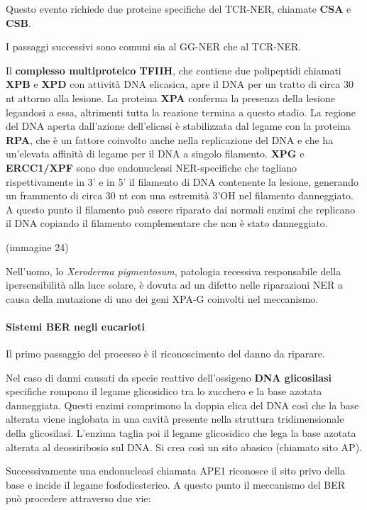 \documentclass[11pt]{book}
\begin{document}
Questo evento richiede due proteine specifiche del TCR-NER, chiamate
\textbf{CSA} e \textbf{CSB}.

I passaggi successivi sono comuni sia al GG-NER che al TCR-NER.

Il \textbf{complesso multiproteico TFIIH}, che contiene due polipeptidi
chiamati \textbf{XPB} e \textbf{XPD} con attività DNA elicasica, apre il
DNA per un tratto di circa 30 nt attorno alla lesione. La proteina
\textbf{XPA} conferma la presenza della lesione legandosi a essa,
altrimenti tutta la reazione termina a questo stadio. La regione del DNA
aperta dall'azione dell'elicasi è stabilizzata dal legame con la
proteina \textbf{RPA}, che è un fattore coinvolto anche nella
replicazione del DNA e che ha un'elevata affinità di legame per il DNA a
singolo filamento. \textbf{XPG} e \textbf{ERCC1/XPF} sono due
endonucleasi NER-specifiche che tagliano rispettivamente in 3' e in 5'
il filamento di DNA contenente la lesione, generando un frammento di
circa 30 nt con una estremità 3'OH nel filamento danneggiato. A questo
punto il filamento può essere riparato dai normali enzimi che replicano
il DNA copiando il filamento complementare che non è stato danneggiato.

(immagine 24)

Nell'uomo, lo \emph{Xeroderma pigmentosum}, patologia recessiva
responsabile della ipersensibilità alla luce solare, è dovuta ad un
difetto nelle riparazioni NER a causa della mutazione di uno dei geni
XPA-G coinvolti nel meccanismo.

\paragraph{Sistemi BER negli
eucarioti}\label{sistemi-ber-negli-eucarioti}

Il primo passaggio del processo è il riconoscimento del danno da
riparare.

Nel caso di danni causati da specie reattive dell'ossigeno \textbf{DNA
glicosilasi} specifiche rompono il legame glicosidico tra lo zucchero e
la base azotata danneggiata. Questi enzimi comprimono la doppia elica
del DNA così che la base alterata viene inglobata in una cavità presente
nella struttura tridimensionale della glicosilasi. L'enzima taglia poi
il legame glicosidico che lega la base azotata alterata al deossiribosio
sul DNA. Si crea così un sito abasico (chiamato sito AP).

Successivamente una endonucleasi chiamata APE1 riconosce il sito privo
della base e incide il legame fosfodiesterico. A questo punto il
meccanismo del BER può procedere attraverso due vie:
\end{document}
